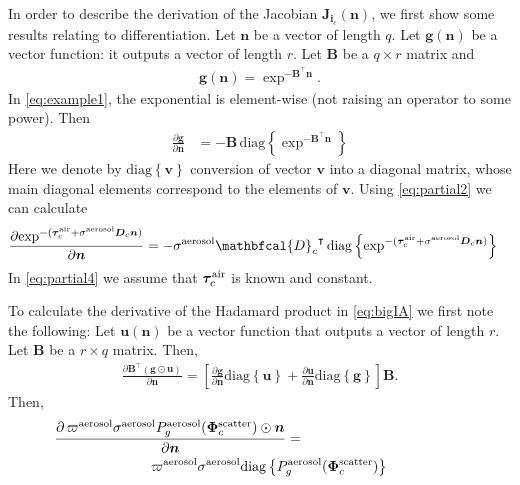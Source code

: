 \documentclass[10pt,letterpaper]{article}
\newcommand{\OpDistance}{\mathbfcal{D}}
\newcommand{\OpDiag}[1]{\mathrm{diag}\left\{#1\right\}}
\newcommand{\PartDeriv}[2]{\frac{\partial{#1}}{\partial{#2}}}
\newcommand{\vect}[1]{\bm{#1}}
\newcommand{\mat}[1]{\bm{#1}}
\newcommand{\transpose}[1]{{#1}^\intercal}
\begin{document}
In order to describe the derivation of the Jacobian ${\bm J}_{{\bm
    i}_c}({\bm n})$, we first show some results relating to
differentiation. Let $\vect{n}$ be a vector of length $q$. Let
$\vect{g}(\vect{n})$ be a vector function: it outputs a vector of
length $r$. Let $\mat{B}$ be a $q \times r$ matrix and
\begin{align}
  \vect{g}(\vect{n}) = \exp^{-\transpose{\mat{B}}\vect{n}}.
  \label{eq:example1}
\end{align}
In \cref{eq:example1}, the exponential is element-wise (not raising an
operator to some power). Then
\begin{align}
  \label{eq:partial2}
  \PartDeriv{\vect{g}}{\vect{n}} &= - \mat{B} \,
  \OpDiag{\exp^{-\transpose{\mat{B}}\vect{n}}}
\end{align}
Here we denote by $\OpDiag{\vect{v}}$ conversion of vector $\vect{v}$
into a diagonal matrix, whose main diagonal elements correspond to the
elements of $\vect{v}$. Using \cref{eq:partial2} we can calculate
\begin{align}
  \label{eq:partial4}
  \PartDeriv{\exp^{-(\vect{\tau}_c^{\rm air} + {\sigma}^{\rm aerosol}
      {\bm D}_c {\bm n})}}
  {\vect{n}} &= - {\sigma}^{\rm aerosol}\transpose{\OpDistance_c} \,
  \OpDiag{\exp^{-(\vect{\tau}_c^{\rm air} + {\sigma}^{\rm aerosol}
      {\bm D}_c {\bm n})}}
\end{align}
In \cref{eq:partial4} we assume that $\vect{\tau}_c^{\rm air}$ is
known and constant.

To calculate the derivative of the Hadamard product in \cref{eq:bigIA}
we first note the following: Let $\vect{u}(\vect{n})$ be a vector
function that outputs a vector of length $r$. Let $\mat{B}$ be a $r
\times q$ matrix. Then,
\begin{align}
  \label{eq:partial1}
  \PartDeriv{\transpose{\mat{B}} (\vect{g} \odot \vect{u})}{\vect{n}}
  = \left[ \PartDeriv{\vect{g}}{\vect{n}} \OpDiag{\vect{u}} +
    \PartDeriv{\vect{u}}{\vect{n}} \OpDiag{\vect{g}} \right] \mat{B}.
\end{align}
Then,
\begin{align}
  \label{eq:partial3}
  \PartDeriv{\, \varpi^{\rm aerosol}\sigma^{\rm aerosol} P^{\rm
      aerosol}_g(\vect{\Phi}^{\rm scatter}_c) \odot{\bm n}}{\vect{n}}
  =
  \;\;\;\;\;\;\;\;\;\;\;\;\;\;\;\;\;\;\;\;\;\;\;\;\;\;\;\;\;\;\;\;\;\;\;\;\;\;\;\;\;\;
  \nonumber \\
  \varpi^{\rm aerosol}\sigma^{\rm aerosol}\OpDiag{P^{\rm
      aerosol}_g(\vect{\Phi}^{\rm scatter}_c)}
  \;\;\;\;\;\;\;\;\;\;\;\;\;\;\;\;\;\;\;\;
\end{align}
\end{document}
